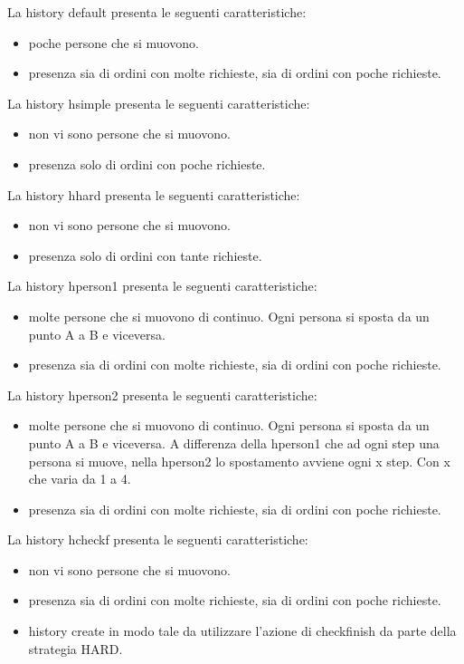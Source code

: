La history default presenta le seguenti caratteristiche:
\begin{itemize}
  \item poche persone che si muovono.
  \item presenza sia di ordini con molte richieste, sia di ordini con poche richieste.
\end{itemize}
La history hsimple presenta le seguenti caratteristiche:
\begin{itemize}
    \item non vi sono persone che si muovono.
    \item presenza solo di ordini con poche richieste.
  \end{itemize}
La history hhard presenta le seguenti caratteristiche:
\begin{itemize}
    \item non vi sono persone che si muovono.
    \item presenza solo di ordini con tante richieste.
  \end{itemize}
La history hperson1 presenta le seguenti caratteristiche:
\begin{itemize}
    \item molte persone che si muovono di continuo. Ogni persona si sposta da un punto A a B e viceversa.
    \item presenza sia di ordini con molte richieste, sia di ordini con poche richieste.
  \end{itemize}
La history hperson2 presenta le seguenti caratteristiche:\begin{itemize}
    \item molte persone che si muovono di continuo. Ogni persona si sposta da un punto A a B e viceversa. A differenza della hperson1 che ad ogni step una persona si muove, nella hperson2 lo spostamento avviene ogni x step. Con x che varia da 1 a 4.
    \item presenza sia di ordini con molte richieste, sia di ordini con poche richieste.
  \end{itemize}
La history hcheckf presenta le seguenti caratteristiche:
\begin{itemize}
    \item non vi sono persone che si muovono.
    \item presenza sia di ordini con molte richieste, sia di ordini con poche richieste.
    \item history create in modo tale da utilizzare l'azione di checkfinish da parte della strategia HARD.
\end{itemize}


